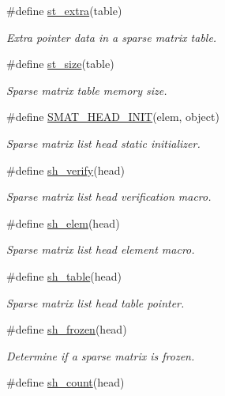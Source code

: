 \begin{CompactItemize}
\#define \hyperlink{group__dbprim__smat_a26}{st\_\-extra}(table)
\begin{CompactList}\small\item\em Extra pointer data in a sparse matrix table.\item\end{CompactList}\item 
\#define \hyperlink{group__dbprim__smat_a27}{st\_\-size}(table)
\begin{CompactList}\small\item\em Sparse matrix table memory size.\item\end{CompactList}\item 
\#define \hyperlink{group__dbprim__smat_a28}{SMAT\_\-HEAD\_\-INIT}(elem, object)
\begin{CompactList}\small\item\em Sparse matrix list head static initializer.\item\end{CompactList}\item 
\#define \hyperlink{group__dbprim__smat_a29}{sh\_\-verify}(head)
\begin{CompactList}\small\item\em Sparse matrix list head verification macro.\item\end{CompactList}\item 
\#define \hyperlink{group__dbprim__smat_a30}{sh\_\-elem}(head)
\begin{CompactList}\small\item\em Sparse matrix list head element macro.\item\end{CompactList}\item 
\#define \hyperlink{group__dbprim__smat_a31}{sh\_\-table}(head)
\begin{CompactList}\small\item\em Sparse matrix list head table pointer.\item\end{CompactList}\item 
\#define \hyperlink{group__dbprim__smat_a32}{sh\_\-frozen}(head)
\begin{CompactList}\small\item\em Determine if a sparse matrix is frozen.\item\end{CompactList}\item 
\#define \hyperlink{group__dbprim__smat_a33}{sh\_\-count}(head)

\end{CompactItemize}
